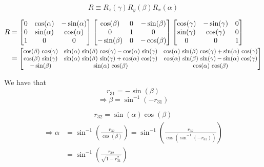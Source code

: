\begin{equation}
    R \equiv R_z(\gamma)R_y(\beta)R_x(\alpha)
\end{equation}

\begin{align}
    R & =
    \begin{bmatrix}
        0 & \cos(\alpha) & -\sin(\alpha) \\
        0 & \sin(\alpha) & \cos(\alpha)  \\
        1 & 0            & 0             \\
    \end{bmatrix}
    \begin{bmatrix}
        \cos(\beta)  & 0 & -\sin(\beta) \\
        0            & 1 & 0            \\
        -\sin(\beta) & 0 & -\cos(\beta)
    \end{bmatrix}
    \begin{bmatrix}
        \cos(\gamma) & -\sin(\gamma) & 0 \\
        \sin(\gamma) & \cos(\gamma)  & 0 \\
        0            & 0             & 1
    \end{bmatrix} \nonumber \\
      & =
    \scalemath{0.85}{
        \begin{bmatrix}
            \cos(\beta)\,\cos(\gamma) & \sin(\alpha)\,\sin(\beta)\,\cos(\gamma) - \cos(\alpha)\,\sin(\gamma) & \cos(\alpha)\,\sin(\beta)\,\cos(\gamma) + \sin(\alpha)\,\cos(\gamma) \\
            \cos(\beta)\,\sin(\gamma) & \sin(\alpha)\,\sin(\beta)\,\sin(\gamma) + \cos(\alpha)\,\cos(\gamma) & \cos(\alpha)\,\sin(\beta)\,\sin(\gamma) - \sin(\alpha)\,\cos(\gamma) \\
            -\sin(\beta)              & \sin(\alpha)\,\cos(\beta)                                            & \cos(\alpha)\,\cos(\beta)
        \end{bmatrix}
    }
\end{align}

We have that
\begin{equation*}
    r_{31} = -\sin(\beta) \nonumber
\end{equation*}
\begin{equation}
    \Rightarrow \beta = \sin^{-1}(-r_{31})
\end{equation}

\begin{equation*}
    r_{32} = \sin(\alpha)\cos(\beta)
\end{equation*}
\begin{align}
    \begin{split}
        \Rightarrow \alpha & = \sin^{-1}\left(\frac{r_{32}}{\cos(\beta)}\right)               = \sin^{-1}\left(\frac{r_{32}}{\cos(\sin^{-1}(-r_{31}))}\right) \\
        & = \sin^{-1}\left(\frac{r_{32}}{\sqrt{1-r_{31}^2}}\right)
    \end{split}
\end{align}

